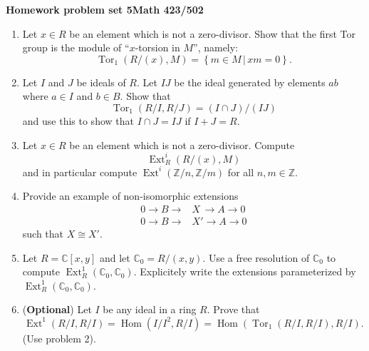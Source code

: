 \documentclass[12pt]{article}
\newcommand{\ZZ}{\mathbb{Z}}
\newcommand{\CC}{\mathbb{C}}
\newcommand{\Tor}{\operatorname{Tor}}
\newcommand{\Ext}{\operatorname{Ext}}
\newcommand{\Hom}{\operatorname{Hom}}
\begin{document}
\begin{center}{\Large
\vspace{2cm}

\bf  Homework problem set 5\quad   Math 423/502\quad  \\
}
\vspace{.5in}

\end{center}

\begin{enumerate}
\item Let $x\in R$ be an element which is not a zero-divisor. Show
that the first Tor group is the module of ``$x$-torsion in $M$'',  namely:
\[
\Tor_{1}(R/(x),M) = \left\{m\in M\,|\,xm=0 \right\}.
\]
\item Let $I$ and $J$ be ideals of $R$. Let $IJ$ be the ideal
generated by elements $ab$ where $a\in I$ and $b\in B$. Show that 
\[
\Tor_{1}(R/I,R/J) = (I\cap J)/(IJ)
\]
and use this to show that $I\cap J=IJ$ if $I+J=R$. 
\item  Let $x\in R$ be an element which is not a zero-divisor. Compute
\[
\Ext^{i}_{R}(R/(x),M)
\]
and in particular compute $\Ext^{i}(\ZZ/n,\ZZ /m)$ for all $n,m\in \ZZ
$. 
\item Provide an example of non-isomorphic extensions 
\begin{align*}
0\to B\to &X\,\to
A\to 0  \\
0\to B\to &X'\to
A\to 0
\end{align*}
such that $X\cong X'$.
\item Let $R=\CC [x,y]$ and let $\CC_{0} = R/(x,y)$. Use a free
resolution of $\CC_{0}$ to compute
$\Ext_{R}^{1}(\CC_{0},\CC_{0})$. Explicitely write the extensions
parameterized by $\Ext_{R}^{1}(\CC_{0},\CC_{0})$.
\item (\textbf{Optional}) Let $I$ be any ideal in a ring $R$. Prove that
\[
\Ext^{1}(R/I,R/I) = \Hom (I/I^{2},R/I) = \Hom
(\Tor_{1}(R/I,R/I),R/I). 
\]
(Use problem 2). 
\end{enumerate}





          
\end{document}
